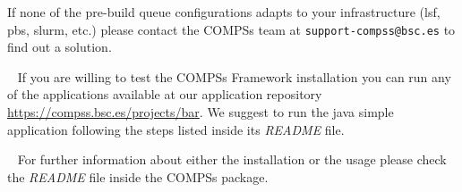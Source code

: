 If none of the pre-build queue configurations adapts to your infrastructure (lsf, pbs, slurm, etc.) please contact 
the COMPSs team at \verb|support-compss@bsc.es| to find out a solution.

~ \newline
If you are willing to test the COMPSs Framework installation you can run any of the applications available at our application 
repository \url{https://compss.bsc.es/projects/bar}. We suggest to run the java simple application following the steps listed
inside its \textit{README} file. 

~ \newline
For further information about either the installation or the usage please check the \textit{README} file inside the COMPSs package. 


